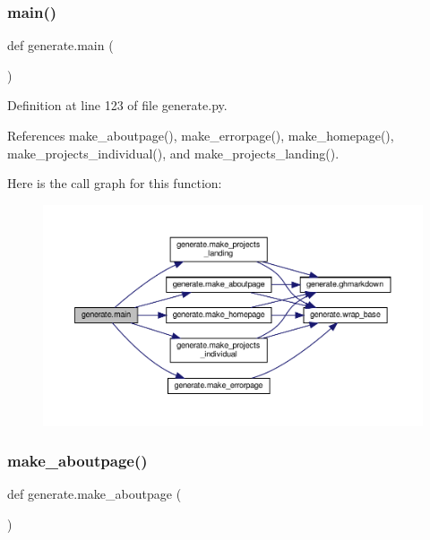 \subsubsection{\texorpdfstring{main()}{main()}}
{\footnotesize\ttfamily def generate.\+main (\begin{DoxyParamCaption}{ }\end{DoxyParamCaption})}



Definition at line 123 of file generate.\+py.



References make\+\_\+aboutpage(), make\+\_\+errorpage(), make\+\_\+homepage(), make\+\_\+projects\+\_\+individual(), and make\+\_\+projects\+\_\+landing().

Here is the call graph for this function\+:
\nopagebreak
\begin{figure}[H]
\begin{center}
\leavevmode
\includegraphics[width=350pt]{namespacegenerate_a7f0253880883fcd9badd715587a15668_cgraph}
\end{center}
\end{figure}
\mbox{\label{namespacegenerate_afa732feea0def89a5b9d1a2a6549ee60}} 
\subsubsection{\texorpdfstring{make\+\_\+aboutpage()}{make\_aboutpage()}}
{\footnotesize\ttfamily def generate.\+make\+\_\+aboutpage (\begin{DoxyParamCaption}{ }\end{DoxyParamCaption})}



